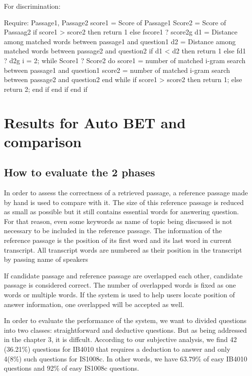 \documentclass[11pt]{article}
\begin{document}
For discrimination:

Require: Passage1, Passage2
score1 = Score of Passage1
Score2 = Score of Passaag2
if score1 > score2 then
return 1
else fscore1 ? score2g d1 = Distance among matched words between passage1 and question1
d2 = Distance among matched words between passage2 and question2
if d1 < d2 then
return 1
else fd1 ? d2g i = 2;
while Score1 ? Score2 do
score1 = number of matched i-gram search between passage1 and question1
score2 = number of matched i-gram search between passage2 and question2
end while
if score1 > score2 then
return 1;
else
return 2;
end if
end if
end if


\section{Results for Auto BET and comparison}
\label{sec:autobet-results}

\subsection{How to evaluate the 2 phases}


In order to assess the correctness of a retrieved passage, a reference passage made by hand is
used to compare with it. The size of this reference passage is reduced as small as possible but
it still contains essential words for answering question. For that reason, even some keywords
as name of topic being discussed is not necessary to be included in the reference passage.
The information of the reference passage is the position of its first word and its last word
in current transcript. All transcript words are numbered as their position in the transcript
by passing name of speakers

If candidate passage and reference passage are overlapped each other, candidate passage is
considered correct. The number of overlapped words is fixed as one words or multiple words.
If the system is used to help users locate position of answer information, one overlapped will
be accepted as well.

In order to evaluate the performance of the system, we want to divided questions into
two classes: straightforward and deductive questions. But as being addressed in the chapter
3, it is diffcult. According to our subjective analysis, we find 42 (36.21\%) questions for
IB4010 that requires a deduction to answer and only 4(8\%) such questions for IS1008c. In
other words, we have 63.79\% of easy IB4010 questions and 92\% of easy IS1008c questions.
\end{document}
